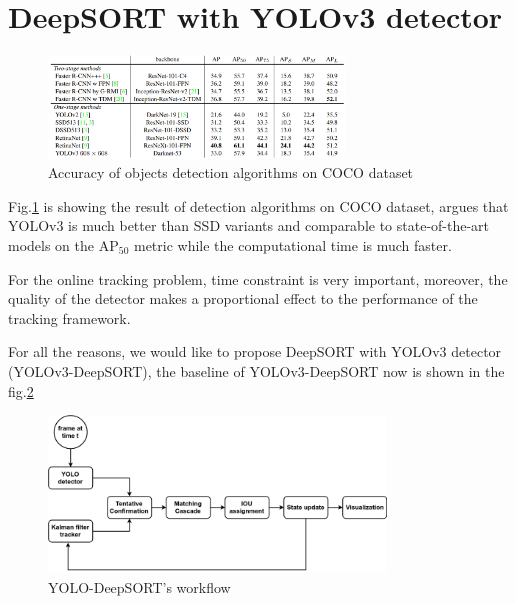 \pagebreak
\section{DeepSORT with YOLOv3 detector}

\begin{figure}[h!]
    \centering
    \includegraphics[width=0.7\textwidth]{Chapters/Fig/yolov3_acc_com.png}
    \caption{Accuracy of objects detection algorithms on COCO dataset}
    \label{fig:yolov3_acc_com}
\end{figure}
Fig.\ref{fig:yolov3_acc_com} \cite{yolov3} is showing the result of detection algorithms on COCO dataset,
\cite{yolov3} argues that YOLOv3 is much better than SSD variants and comparable to state-of-the-art
models on the $\text{AP}_{50}$ metric while the computational time is much faster.\par
For the online tracking problem, time constraint is very important, moreover, the quality of the detector makes a proportional effect to the performance of the tracking framework.\par
For all the reasons, we would like to propose DeepSORT with YOLOv3 detector (YOLOv3-DeepSORT), the baseline of YOLOv3-DeepSORT now is shown in the fig.\ref{fig:yolo_deepsort} 
\begin{figure}[h!]
    \centering
    \includegraphics[width=0.8\textwidth]{Chapters/Fig/Thesis_diagram-yolo_deepsort.png}
    \caption{YOLO-DeepSORT's workflow}
    \label{fig:yolo_deepsort}
\end{figure}
